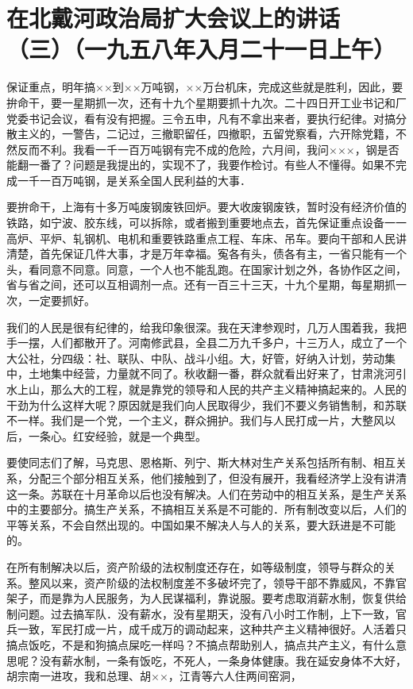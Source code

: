 \section[在北戴河政治局扩大会议上的讲话（三）（一九五八年入月二十一日上午）]{在北戴河政治局扩大会议上的讲话（三）（一九五八年入月二十一日上午）}


保证重点，明年搞××到××万吨钢，××万台机床，完成这些就是胜利，因此，要拚命干，要一星期抓一次，还有十九个星期要抓十九次。二十四日开工业书记和厂党委书记会议，看有没有把握。三令五申，凡有不拿出来者，要执行纪律。对搞分散主义的，一警告，二记过，三撤职留任，四撤职，五留党察看，六开除党籍，不然反而不利。我看一千一百万吨钢有完不成的危险，六月间，我问×××，钢是否能翻一番了？问题是我提出的，实现不了，我要作检讨。有些人不懂得。如果不完成一千一百万吨钢，是关系全国人民利益的大事．

要拚命干，上海有十多万吨废钢废铁回炉。要大收废钢废铁，暂时没有经济价值的铁路，如宁波、胶东线，可以拆除，或者搬到重要地点去，首先保证重点设备一一高炉、平炉、轧钢机、电机和重要铁路重点工程、车床、吊车。要向干部和人民讲清楚，首先保证几件大事，才是万年幸福。寃各有头，债各有主，一省只能有一个头，看同意不同意。同意，一个人也不能乱跑。在国家计划之外，各协作区之间，省与省之间，还可以互相调剂一点。还有一百三十三天，十九个星期，每星期抓一次，一定要抓好。

我们的人民是很有纪律的，给我印象很深。我在天津参观时，几万人围着我，我把手一摆，人们都散开了。河南修武县，全县二万九千多户，十三万人，成立了一个大公社，分四级：社、联队、中队、战斗小组。大，好管，好纳入计划，劳动集中，土地集中经营，力量就不同了。秋收翻一番，群众就看出好来了，甘肃洮河引水上山，那么大的工程，就是靠党的领导和人民的共产主义精神搞起来的。人民的干劲为什么这样大呢？原因就是我们向人民取得少，我们不要义务销售制，和苏联不一样。我们是一个党，一个主义，群众拥护。我们与人民打成一片，大整风以后，一条心。红安经验，就是一个典型。

要使同志们了解，马克思、恩格斯、列宁、斯大林对生产关系包括所有制、相互关系，分配三个部分相互关系，他们接触到了，但没有展开，我看经济学上没有讲清这一条。苏联在十月革命以后也没有解决。人们在劳动中的相互关系，是生产关系中的主要部分。搞生产关系，不搞相互关系是不可能的．所有制改变以后，人们的平等关系，不会自然出现的。中国如果不解决人与人的关系，要大跃进是不可能的。

在所有制解决以后，资产阶级的法权制度还存在，如等级制度，领导与群众的关系。整风以来，资产阶级的法权制度差不多破坏完了，领导干部不靠威风，不靠官架子，而是靠为人民服务，为人民谋福利，靠说服。要考虑取消薪水制，恢复供给制问题。过去搞军队．没有薪水，没有星期天，没有八小时工作制，上下一致，官兵一致，军民打成一片，成千成万的调动起来，这种共产主义精神很好。人活着只搞点饭吃，不是和狗搞点屎吃一样吗？不搞点帮助别人，搞点共产主义，有什么意思呢？没有薪水制，一条有饭吃，不死人，一条身体健康。我在延安身体不大好，胡宗南一进攻，我和总理、胡××，江青等六人住两间窑洞，

